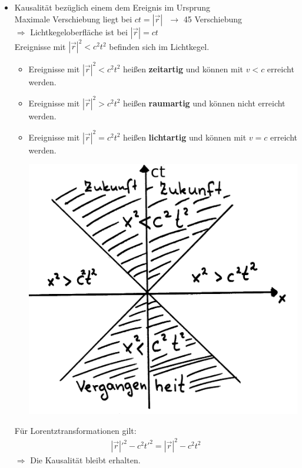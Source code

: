 \begin{itemize}
\item{ Kausalität bezüglich einem dem Ereignis im Ursprung}\\
Maximale Verschiebung liegt bei $ct = |\vec r| \ \ \ \rightarrow$ 45 \grat Verschiebung\\
$\Longrightarrow$ Lichtkegeloberfläche ist bei $|\vec r| = ct$\\
Ereignisse mit $|\vec r|^ 2<c^2 t^ 2$ befinden sich im Lichtkegel.\\
\begin{itemize}
\item Ereignisse mit $|\vec r|^ 2<c^2 t^ 2$ heißen {\bf zeitartig} und können mit $v<c$ erreicht werden.
\item Ereignisse mit $|\vec r|^ 2 > c^ 2t^ 2$ heißen {\bf raumartig} und können nicht erreicht werden.
\item Ereignisse mit $|\vec r| ^ 2 = c^2t^ 2$ heißen {\bf lichtartig} und können mit $v=c$ erreicht werden.

\begin{center}
	\includegraphics[scale=0.10]{Figs/Pim000112.png}
\end{center}

\end{itemize}
Für Lorentztransformationen gilt: 
\begin{eqnarray*}
|\vec r|'^ 2-c^ 2t'^ 2 = |\vec r|^ 2- c^ 2t^ 2
\end{eqnarray*}
$\Longrightarrow$ Die Kausalität bleibt erhalten.
\end{itemize}


